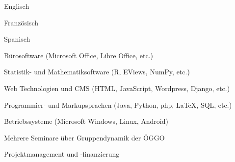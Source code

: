 


{\begin{cvenumerate}
		\item Englisch 
		\item Französisch 
		\item Spanisch 
	\end{cvenumerate}}

%

	{\begin{cvenumerate}
		\item Bürosoftware (Microsoft Office, Libre Office, etc.) 
		\item Statistik- und Mathematiksoftware (R, EViews, NumPy, etc.) 
		\item Web Technologien und CMS (HTML, JavaScript, Wordpress, Django, etc.) 
		\item Programmier- und Markupsprachen (Java, Python, php, LaTeX, SQL, etc.) 
		\item Betriebssysteme (Microsoft Windows, Linux, Android) 
	\end{cvenumerate}}

	{\begin{cvenumerate}
		\item Mehrere Seminare über Gruppendynamik der ÖGGO
		\item Projektmanagement und -finanzierung
	\end{cvenumerate}}

